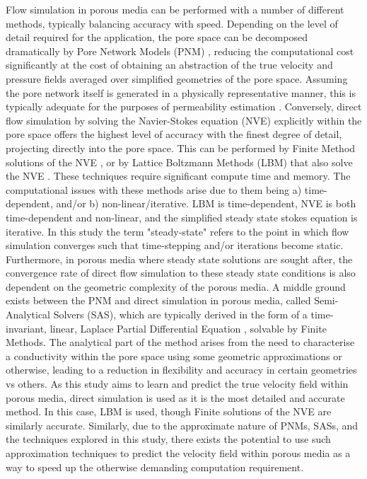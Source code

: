 \documentclass{article}
\begin{document}
Flow simulation in porous media can be performed with a number of different methods, typically balancing accuracy with speed. Depending on the level of detail required for the application, the pore space can be decomposed dramatically by Pore Network Models (PNM) \cite{BLUNT20021069,pnm1,rabbani2019hybrid}, reducing the computational cost significantly at the cost of obtaining an abstraction of the true velocity and pressure fields averaged over simplified geometries of the pore space. Assuming the pore network itself is generated in a physically representative manner, this is typically adequate for the purposes of permeability estimation \cite{pnmperm}. Conversely, direct flow simulation by solving the Navier-Stokes equation (NVE) explicitly within the pore space offers the highest level of accuracy with the finest degree of detail, projecting directly into the pore space. This can be performed by Finite Method solutions of the NVE \cite{finite6,finite5,finite4,finite3,finite2,finite1}, or by Lattice Boltzmann Methods (LBM) that also solve the NVE \cite{MCCLURE20141865,lbm1,lbm2,lbm3,lbm4,lbm5,lbm6,lbm7}. These techniques require significant compute time and memory. The computational issues with these methods arise due to them being a) time-dependent, and/or b) non-linear/iterative. LBM is time-dependent, NVE is both time-dependent and non-linear, and the simplified steady state stokes equation \cite{peymanK} is iterative. In this study the term "steady-state" refers to the point in which flow simulation converges such that time-stepping and/or iterations become static. Furthermore, in porous media where steady state solutions are sought after, the convergence rate of direct flow simulation to these steady state conditions is also dependent on the geometric complexity of the porous media. A middle ground exists between the PNM and direct simulation in porous media, called Semi-Analytical Solvers (SAS), which are typically derived in the form of a time-invariant, linear, Laplace Partial Differential Equation \cite{pfvs,DGDD,wang2019multi,torskaya2014grain,shabro2012finite}, solvable by Finite Methods. The analytical part of the method arises from the need to characterise a conductivity within the pore space using some geometric approximations or otherwise, leading to a reduction in flexibility and accuracy in certain geometries vs others. As this study aims to learn and predict the true velocity field within porous media, direct simulation is used as it is the most detailed and accurate method. In this case, LBM is used, though Finite solutions of the NVE are similarly accurate. Similarly, due to the approximate nature of PNMs, SASs, and the techniques explored in this study, there exists the potential to use such approximation techniques to predict the velocity field within porous media as a way to speed up the otherwise demanding computation requirement.
\end{document}
